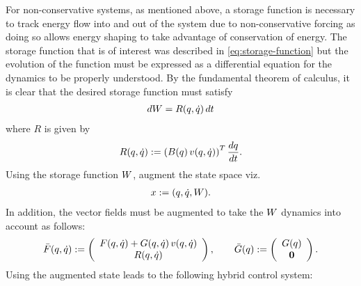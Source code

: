 For non-conservative systems, as mentioned above, a storage function is
necessary to track energy flow into and out of the system due to
non-conservative forcing as doing so allows energy shaping to take advantage of
conservation of energy.
%
The storage function that is of interest was described in
\eqref{eq:storage-function} but the evolution of the function must be expressed
as a differential equation for the dynamics to be properly understood.
%
By the fundamental theorem of calculus, it is clear that the desired storage
function must satisfy
\begin{align*}
  dW = R(q, \dot{q}) \, dt
\end{align*}
where $R$ is given by
\begin{align*}
  R(q, \dot{q}) := \left(B(q) \, v(q, \dot{q})\right)^{T} \frac{dq}{dt}.
\end{align*}
%
Using the storage function $W$, augment the state space viz.
\begin{align*}
  x := (q, \dot{q}, W).
\end{align*}
%
In addition, the vector fields must be augmented to take the $W$ dynamics into
account as follows:
\begin{align*}
  {\bar {F}}(q, \dot{q}) := \left(\begin{array}{c}
      F(q, \dot{q}) + G(q, \dot{q}) \, v(q, \dot{q})\\
      R(q, \dot{q})
    \end{array}\right), \qquad
  {\bar {G}}(q) := \left(\begin{array}{c}
      G(q)\\
      {\mathbf 0}
    \end{array}\right).
\end{align*}
Using the augmented state leads to the following hybrid control system:
